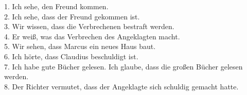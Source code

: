\documentclass[a4paper]{article}
\begin{document}
1. Ich sehe, den Freund kommen. \\
2. Ich sehe, dass der Freund gekommen ist. \\
3. Wir wissen, dass die Verbrechenen bestraft werden. \\
4. Er weiß, was das Verbrechen des Angeklagten macht. \\
5. Wir sehen, dass Marcus ein neues Haus baut. \\
6. Ich hörte, dass Claudius beschuldigt ist. \\
7. Ich habe gute Bücher gelesen. Ich glaube, dass die großen Bücher gelesen werden. \\
8. Der Richter vermutet, dass der Angeklagte sich schuldig gemacht hatte.
\end{document}
